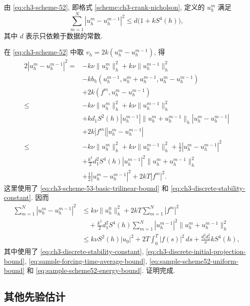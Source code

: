 \begin{Lemma}
\label{lem:ch3-scheme-52-complementary-estimate}
由 \eqref{eq:ch3-scheme-52}, 即格式 \ref{scheme:ch3-crank-nicholson}, 定义的 $u_h^m$ 满足
\begin{equation}
\sum_{m=1}^N|u_h^m-u_h^{m-1}|^2\leq d\bigl(1+kS^4(h)\bigr),
\label{eq:ch3-scheme-52-increment-bound}
\end{equation}
其中 $d$ 表示只依赖于数据的常数.
\end{Lemma}

\begin{Proof}
在 \eqref{eq:ch3-scheme-52} 中取 $v_h=2k(u_h^m-u_h^{m-1})$, 得
\begin{align*}
2|u_h^m-u_h^{m-1}|^2
={}&-k\nu\lVert u_h^m\rVert_h^2+k\nu\lVert u_h^{m-1}\rVert_h^2\\
&-kb_h(u_h^{m-1},u_h^m+u_h^{m-1},u_h^m-u_h^{m-1})\\
&+2k(f^m,u_h^m-u_h^{m-1})\\
\leq{}&-k\nu\lVert u_h^m\rVert_h^2+k\nu\lVert u_h^{m-1}\rVert_h^2\\
&+kd_1S^2(h)|u_h^{m-1}|\lVert u_h^m+u_h^{m-1}\rVert_h
|u_h^m-u_h^{m-1}|\\
&+2k|f^m||u_h^m-u_h^{m-1}|\\
\leq{}&-k\nu\lVert u_h^m\rVert_h^2+k\nu\lVert u_h^{m-1}\rVert_h^2
+\frac12|u_h^m-u_h^{m-1}|^2\\
&+\frac{k^2}{2}d_1^2S^4(h)|u_h^{m-1}|^2
\lVert u_h^m+u_h^{m-1}\rVert_h^2\\
&+\frac12|u_h^m-u_h^{m-1}|^2+2kT|f^m|^2.
\end{align*}
这里使用了 \eqref{eq:ch3-scheme-53-basic-trilinear-bound} 和 \eqref{eq:ch3-discrete-stability-constant}. 因而
\begin{align*}
\sum_{m=1}^N|u_h^m-u_h^{m-1}|^2
&\leq k\nu\lVert u_h^0\rVert_h^2+2kT\sum_{m=1}^N|f^m|^2\\
&\quad+\frac{k^2}{2}d_1^2S^4(h)
\sum_{m=1}^N|u_h^{m-1}|^2\lVert u_h^m+u_h^{m-1}\rVert_h^2\\
&\leq k\nu S^2(h)|u_0|^2+2T\int_0^T|f(s)|^2\,ds
+\frac{d_1^2d_2^2}{\nu}kS^4(h),
\end{align*}
其中使用了 \eqref{eq:ch3-discrete-stability-constant}, \eqref{eq:ch3-discrete-initial-projection-bound}, \eqref{eq:sample-forcing-time-average-bound}, \eqref{eq:sample-scheme52-uniform-bound} 和 \eqref{eq:sample-scheme52-energy-bound}. 证明完成.
\end{Proof}

\subsection{其他先验估计}
\label{subsec:ch3-fractional-estimates}

